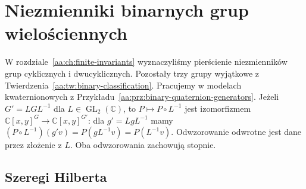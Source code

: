 \chapter{Niezmienniki binarnych grup wielościennych}
\label{aa:ch:exceptional-invariants}

W rozdziale~\ref{aa:ch:finite-invariants} wyznaczyliśmy
pierścienie niezmienników grup cyklicznych i dwucyklicznych.
Pozostały trzy grupy wyjątkowe z
Twierdzenia~\ref{aa:tw:binary-classification}.
Pracujemy w modelach kwaternionowych z
Przykładu~\ref{aa:prz:binary-quaternion-generators}.
Jeżeli $G'=LGL^{-1}$ dla $L\in\operatorname{GL}_2(\mathbb C)$,
to $P\mapsto P\circ L^{-1}$ jest izomorfizmem
$\mathbb C[x,y]^G\to\mathbb C[x,y]^{G'}$:
dla $g'=LgL^{-1}$ mamy
$(P\circ L^{-1})(g'v)=P(gL^{-1}v)=P(L^{-1}v)$.
Odwzorowanie odwrotne jest dane przez złożenie z $L$.
Oba odwzorowania zachowują stopnie.

\section{Szeregi Hilberta}

